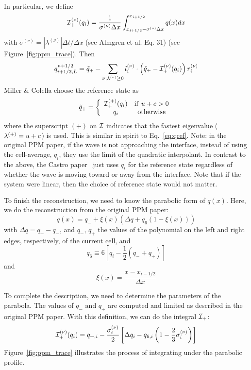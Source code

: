 In particular, we define
\begin{equation}
{\mathcal{I}}_+^{(\nu)}(q_i) = \frac{1}{\sigma^{(\nu)} \Delta x} \int _{x_{i+1/2} - \sigma^{(\nu)} \Delta x}^{x_{i+1/2}} q(x) dx
\end{equation}
with $\sigma^{(\nu)} = |\lambda^{(\nu)}|\Delta t / \Delta x$ (see Almgren et
al. Eq. 31)  (see Figure~\ref{fig:ppm_trace}).  Then
\begin{equation}
q_{i+1/2,L}^{n+1/2} = \tilde{q}_+ -
   \sum_{\nu;\lambda^{(\nu)}\ge 0} l_i^{(\nu)} \cdot \left (
        \tilde{q}_+ - {\mathcal{I}}_+^{(\nu)}(q_i)
       \right ) r_i^{(\nu)}  \label{eq:ppmtrace}
\end{equation}
Miller \& Colella choose the reference state as
\begin{equation}
\tilde{q}_+ = \left \{ \begin{array}{cc}
       {\mathcal{I}}_+^{(+)}(q_i) & \mathrm{if~} u + c > 0 \\
       q_i                    & \mathrm{otherwise}
\end{array}
\right .
\end{equation}
where the superscript $(+)$ on ${\mathcal{I}}$ indicates that the
fastest eigenvalue ($\lambda^{(+)} = u + c$) is used.  This is similar in
spirit to Eq.~\ref{eq:qref}.  Note: in the original PPM paper, if the
wave is not approaching the interface, instead of using the
cell-average, $q_i$, they use the limit of the quadratic interpolant.
In contrast to the above, the Castro paper~\cite{almgren:2010} just
uses $q_i$ for the reference state regardless of whether the wave is
moving toward or away from the interface.  Note that if the system
were linear, then the choice of reference state would not matter.

To finish the reconstruction, we need to know the parabolic form
of $q(x)$.  Here, we do the reconstruction from the original PPM
paper:
\begin{equation}
q(x) = q_{-} + \xi(x) \left ( \Delta q + q_6 (1 - \xi(x) ) \right )
\end{equation}
with $\Delta q = q_+ - q_-$, and $q_-$, $q_+$ the values of the polynomial
on the left and right edges, respectively, of the current cell, and
\begin{equation}
q_6 \equiv 6 \left [ q_i - \frac{1}{2} (q_- + q_+) \right ]
\end{equation}
and
\begin{equation}
\xi(x) = \frac{x - x_{i-1/2}}{\Delta x}
\end{equation}

To complete the description, we need to determine the parameters of
the parabola.  The values of $q_-$ and $q_+$ are computed and limited
as described in the original PPM paper.  With this definition, we can
do the integral ${\mathcal{I}}_+$:
\begin{equation}
{\mathcal{I}}_+^{(\nu)}(q_i) = q_{+,i} - \frac{\sigma_i^{(\nu)}}{2}
   \left [ \Delta q_i - q_{6,i} \left ( 1 - \frac{2}{3} \sigma_i^{(\nu)} \right ) \right ]
\end{equation}
Figure~\ref{fig:ppm_trace} illustrates the process of integrating under
the parabolic profile.


